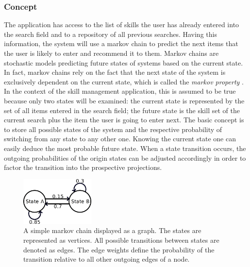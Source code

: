 \newpage

\subsubsection{Concept}
The application has access to the list of skills the user has already entered into the search field and to a repository of all previous searches. Having this information, the system will use a markov chain to predict the next items that the user is likely to enter and recommend it to them.
Markov chains are stochastic models predicting future states of systems based on the current state. In fact, markov chains rely on the fact that the next state of the system is exclusively dependent on the current state, which is called the \textit{markov property} \cite{markprop}. In the context of the skill management application, this is assumed to be true because only two states will be examined: the current state is represented by the set of all items entered in the search field; the future state is the skill set of the current search plus the item the user is going to enter next.
The basic concept is to store all possible states of the system and the respective probability of switching from any state to any other one.
Knowing the current state one can easily deduce the most probable future state. When a state transition occurs, the outgoing probabilities of the origin states
can be adjusted accordingly in order to factor the transition into the prospective projections.
\begin{figure}[!htp]
    \centering
    \includegraphics[width=0.33\textwidth]{images/markov-chain.png}
    \caption[Diagram: Markov Chain]{A simple markov chain displayed as a graph. The states are represented as vertices. All possible transitions between states are denoted as edges. The edge weights define the probability of the transition relative to all other outgoing edges of a node.}
    \label{fig:markovchain}
\end{figure}

\newpage

